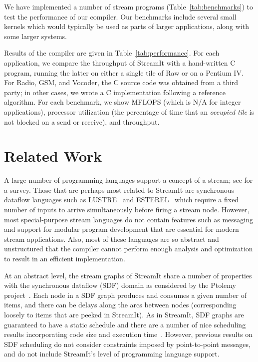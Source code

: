 \documentclass[final]{ijpp}
\begin{document}
We    have     implemented    a    number     of    stream    programs
(Table~\ref{tab:benchmarks}) to test  the performance of our compiler.
Our benchmarks include several  small kernels which would typically be
used as parts of larger applications, along with some larger systems.

Results of the compiler are given in Table~\ref{tab:performance}.  For
each  application,  we  compare  the  throughput of  StreamIt  with  a
hand-written C program, running the  latter on either a single tile of
Raw or  on a Pentium  IV.  For Radio,  GSM, and Vocoder, the  C source
code was  obtained from a  third party; in  other cases, we wrote  a C
implementation following  a reference algorithm.   For each benchmark,
we  show MFLOPS  (which is  N/A for  integer  applications), processor
utilization (the percentage of time that an {\it occupied tile} is not
blocked on a send or receive), and throughput.


\section{Related Work}
\label{sec:related}

A large number of programming languages support a concept of a stream;
see \cite{survey97} for a survey.  Those that are perhaps most related
to   StreamIt    are   synchronous   dataflow    languages   such   as
LUSTRE~\cite{lustre}  and  ESTEREL~\cite{esterel92}  which  require  a
fixed number of inputs to arrive simultaneously before firing a stream
node.  However,  most special-purpose stream languages  do not contain
features such as messaging and support for modular program development
that  are essential  for modern  stream applications.   Also,  most of
these  languages are so  abstract and  unstructured that  the compiler
cannot  perform  enough analysis  and  optimization  to  result in  an
efficient implementation.

At an abstract level, the stream  graphs of StreamIt share a number of
properties with the synchronous dataflow (SDF) domain as considered by
the Ptolemy project~\cite{ptolemyoverview}.  Each  node in a SDF graph
produces and consumes a given number of items, and there can be delays
along the arcs between nodes  (corresponding loosely to items that are
peeked in  StreamIt).  As  in StreamIt, SDF  graphs are  guaranteed to
have  a static  schedule and  there are  a number  of  nice scheduling
results  incorporating  code  size and  execution  time~\cite{leesdf}.
However,  previous   results  on   SDF  scheduling  do   not  consider
constraints  imposed by  point-to-point messages,  and do  not include
StreamIt's level of programming language support.
\end{document}
